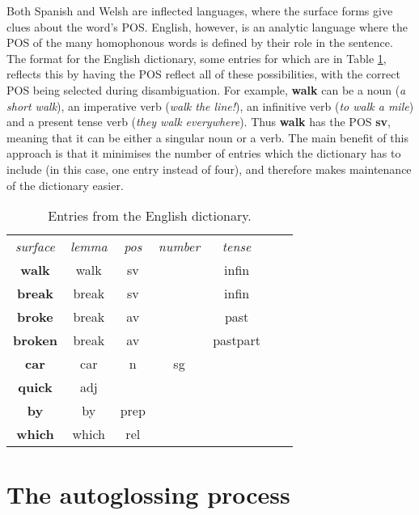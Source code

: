 \documentclass[11pt]{article}
\begin{document}
Both Spanish and Welsh are inflected languages, where the surface forms give clues about the word's POS.  English, however, is an analytic language where the POS of the many homophonous words is defined by their role in the sentence.  The format for the English dictionary, some entries for which are in Table \ref{english_dict}, reflects this by having the POS reflect all of these possibilities, with the correct POS being selected during disambiguation.  For example, \textbf{walk} can be a noun (\textit{a short walk}), an imperative verb (\textit{walk the line!}), an infinitive verb (\textit{to walk a mile}) and a present tense verb (\textit{they walk everywhere}).  Thus \textbf{walk} has the POS \textbf{sv}, meaning that it can be either a singular noun or a verb. The main benefit of this approach is that it minimises the number of entries which the dictionary has to include (in this case, one entry instead of four), and therefore makes maintenance of the dictionary easier.

\begin{table}[!hbtp]
\centering
\begin{scriptsize}
\begin{tabular}{ccccccc}
\textit{surface} & \textit{lemma} & \textit{pos} & \textit{number} & \textit{tense} \\
\textbf{walk} & walk & sv & & infin \\
\textbf{break} & break & sv & & infin \\
\textbf{broke} & break & av & & past \\
\textbf{broken} & break & av & & pastpart \\
\textbf{car} & car & n & sg & \\
\textbf{quick} & adj & & & \\
\textbf{by} & by & prep & & \\
\textbf{which} & which & rel & & \\
\end{tabular}
\end{scriptsize}
\caption{Entries from the English dictionary.}
\label{english_dict}
\end{table}


\section{The autoglossing process}
\label{sec:autoglosser}
\end{document}
